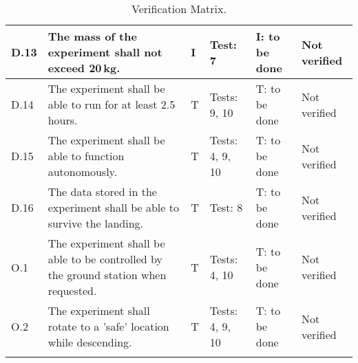 \begin{longtable}[]{|m{}| m{}|m{}|m{}|m{}|m{}|}
D.13 & The mass of the experiment shall not exceed 20\,kg.
& I & Test: 7 & I: to be done & Not verified \\\hline

D.14 & The experiment shall be able to run for at least 2.5\,hours.
& T & Tests: 9, 10 & T: to be done & Not verified \\\hline

D.15 & The experiment shall be able to function autonomously.
& T & Tests: 4, 9, 10 & T: to be done & Not verified \\\hline

D.16 & The data stored in the experiment shall be able to survive the landing.
& T & Test: 8 & T: to be done & Not verified \\\hline

O.1 & The experiment shall be able to be controlled by the ground station when requested.
& T & Tests: 4, 10 & T: to be done & Not verified \\\hline

O.2 & The experiment shall rotate to a 'safe' location while descending.
& T & Tests: 4, 9, 10 & T: to be done & Not verified \\\hline

\caption{Verification Matrix.}
\label{tab:var-mat}
\end{longtable}
\raggedbottom